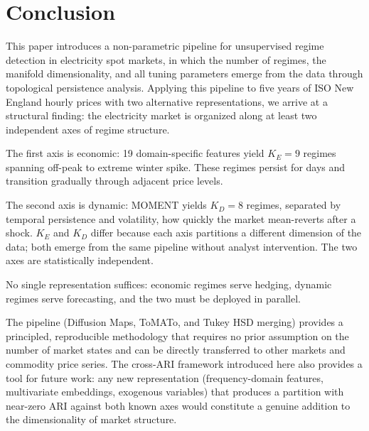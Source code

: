 \documentclass[12pt]{article}
\begin{document}
\section{Conclusion}
\label{sec:conclusion}

This paper introduces a non-parametric pipeline for unsupervised regime detection in electricity spot markets, in which the number of regimes, the manifold dimensionality, and all tuning parameters emerge from the data through topological persistence analysis.
Applying this pipeline to five years of ISO New England hourly prices with two alternative representations, we arrive at a structural finding: the electricity market is organized along at least two independent axes of regime structure.

The first axis is economic: 19 domain-specific features yield $K_E = 9$ regimes spanning off-peak to extreme winter spike.
These regimes persist for days and transition gradually through adjacent price levels.

The second axis is dynamic: MOMENT yields $K_D = 8$ regimes, separated by temporal persistence and volatility, how quickly the market mean-reverts after a shock.
$K_E$ and $K_D$ differ because each axis partitions a different dimension of the data; both emerge from the same pipeline without analyst intervention.
The two axes are statistically independent.

No single representation suffices: economic regimes serve hedging, dynamic regimes serve forecasting, and the two must be deployed in parallel.

The pipeline (Diffusion Maps, ToMATo, and Tukey HSD merging) provides a principled, reproducible methodology that requires no prior assumption on the number of market states and can be directly transferred to other markets and commodity price series.
The cross-ARI framework introduced here also provides a tool for future work: any new representation (frequency-domain features, multivariate embeddings, exogenous variables) that produces a partition with near-zero ARI against both known axes would constitute a genuine addition to the dimensionality of market structure.



\end{document}
